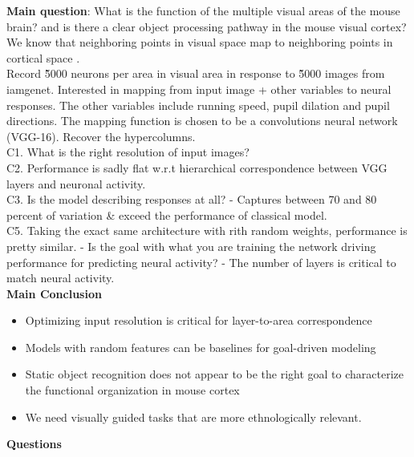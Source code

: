 \documentclass[12pt]{article}
\begin{document}
\textbf{Main question}: What is the function of the multiple visual areas of the mouse brain? and is there a clear object processing pathway in the mouse visual cortex? \\

We know that neighboring points in visual space map to neighboring points in cortical space \cite{Wang2007}. \\

Record \~5000 neurons per area in visual area in response to \~5000 images from iamgenet. Interested in mapping from input image + other variables to neural responses. The other variables include running speed, pupil dilation and pupil directions. The mapping function is chosen to be a convolutions neural network (VGG-16). Recover the hypercolumns. \\

C1. What is the right resolution of input images? \\

C2. Performance is sadly flat w.r.t hierarchical correspondence between VGG layers and neuronal activity. \\

C3. Is the model describing responses at all? - Captures between 70 and 80 percent of variation \& exceed the performance of classical model. \\

C5. Taking the exact same architecture with rith random weights, performance is pretty similar. - Is the goal with what you are training the network driving performance for predicting neural activity? - The number of layers is critical to match neural activity. \\

\textbf{Main Conclusion} \\
\begin{itemize}
    \item Optimizing input resolution is critical for layer-to-area correspondence
    \item Models with random features can be baselines for goal-driven modeling
    \item Static object recognition does not appear to be the right goal to characterize the functional organization in mouse cortex
    \item We need visually guided tasks that are more ethnologically relevant. 
\end{itemize}

\textbf{Questions} \\
\end{document}
